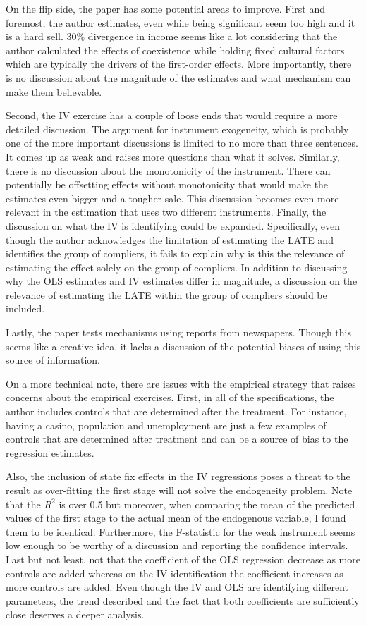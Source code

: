 On the flip side, the paper has some potential areas to improve. First and foremost, the author estimates, even while being significant seem too high and it is a hard sell. 30\% divergence in income seems like a lot considering that the author calculated the effects of coexistence while holding fixed cultural factors which are typically the drivers of the first-order effects. More importantly, there is no discussion about the magnitude of the estimates and what mechanism can make them believable. 

Second, the IV exercise has a couple of loose ends that would require a more detailed discussion. The argument for instrument exogeneity, which is probably one of the more important discussions is limited to no more than three sentences. It comes up as weak and raises more questions than what it solves. Similarly, there is no discussion about the monotonicity of the instrument. There can potentially be offsetting effects without monotonicity that would make the estimates even bigger and a tougher sale. This discussion becomes even more relevant in the estimation that uses two different instruments. Finally, the discussion on what the IV is identifying could be expanded. Specifically, even though the author acknowledges the limitation of estimating the LATE and identifies the group of compliers, it fails to explain why is this the relevance of estimating the effect solely on the group of compliers. In addition to discussing why the OLS estimates and IV estimates differ in magnitude, a discussion on the relevance of estimating the LATE within the group  of compliers should be included. 

Lastly, the paper tests mechanisms using reports from newspapers. Though this seems like a creative idea, it lacks a discussion of the potential biases of using this source of information. 

On a more technical note, there are issues with the empirical strategy that raises concerns about the empirical exercises. First, in all of the specifications, the author includes controls that are determined after the treatment. For instance, having a casino, population and unemployment are just a few examples of controls that are determined after treatment and can be a source of bias to the regression estimates.  

Also, the inclusion of state fix effects in the IV regressions poses a threat to the result as over-fitting the first stage will not solve the endogeneity problem. Note that the $R^2$ is over 0.5 but moreover, when comparing the mean of the predicted values of the first stage to the actual mean of the endogenous variable, I found them to be identical. Furthermore, the F-statistic for the weak instrument seems low enough to be worthy of a discussion and reporting the confidence intervals. Last but not least, not that the coefficient of the OLS regression decrease as more controls are added whereas on the IV identification the coefficient increases as more controls are added. Even though the IV and OLS are identifying different parameters, the trend described and the fact that both coefficients are sufficiently close deserves a deeper analysis. 
